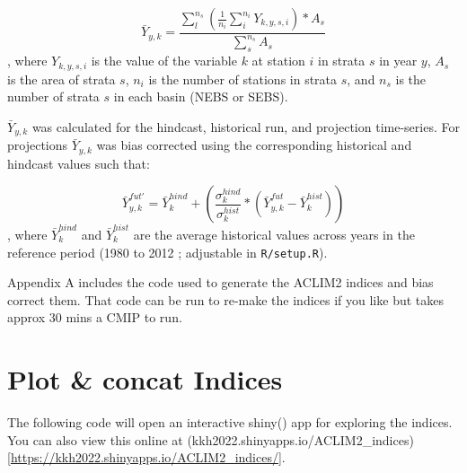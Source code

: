 \documentclass[
]{article}
\newenvironment{Shaded}{\begin{snugshade}}{\end{snugshade}}
\newcommand{\AttributeTok}[1]{\textcolor[rgb]{0.77,0.63,0.00}{#1}}
\newcommand{\CommentTok}[1]{\textcolor[rgb]{0.56,0.35,0.01}{\textit{#1}}}
\newcommand{\FunctionTok}[1]{\textcolor[rgb]{0.00,0.00,0.00}{#1}}
\newcommand{\NormalTok}[1]{#1}
\newcommand{\OtherTok}[1]{\textcolor[rgb]{0.56,0.35,0.01}{#1}}
\newcommand{\SpecialCharTok}[1]{\textcolor[rgb]{0.00,0.00,0.00}{#1}}
\newcommand{\StringTok}[1]{\textcolor[rgb]{0.31,0.60,0.02}{#1}}
\begin{document}
\[\bar{Y}_{y,k}= \frac{\sum^{n_s}_{l}(\frac{1}{n_i}\sum^{n_i}_{i}Y_{k,y,s,i})*A_s} {\sum^{n_s}_{s}{A_s}}\],
where \(Y_{k,y,s,i}\) is the value of the variable \(k\) at station
\(i\) in strata \(s\) in year \(y\), \(A_s\) is the area of strata
\(s\), \(n_i\) is the number of stations in strata \(s\), and \(n_s\) is
the number of strata \(s\) in each basin (NEBS or SEBS).

\(\bar{Y}_{y,k}\) was calculated for the hindcast, historical run, and
projection time-series. For projections \(\bar{Y}_{y,k}\) was bias
corrected using the corresponding historical and hindcast values such
that:

\[\bar{Y}^{fut'}_{y,k} =\bar{Y}^{hind}_{k} +\left( \frac{\sigma^{hind}_{k}}{\sigma^{hist}_{k}}*(\bar{Y}^{fut}_{y,k}-\bar{Y}^{hist}_{k})  \right )\],
where \(\bar{Y}^{hind}_{k}\) and \(\bar{Y}^{hist}_{k}\) are the average
historical values across years in the reference period (1980 to 2012 ;
adjustable in \texttt{R/setup.R}).

Appendix A includes the code used to generate the ACLIM2 indices and
bias correct them. That code can be run to re-make the indices if you
like but takes approx 30 mins a CMIP to run.

\hypertarget{plot-concat-indices}{%
\section{Plot \& concat Indices}\label{plot-concat-indices}}

The following code will open an interactive shiny() app for exploring
the indices. You can also view this online at
(kkh2022.shinyapps.io/ACLIM2\_indices){[}\url{https://kkh2022.shinyapps.io/ACLIM2_indices/}{]}.

\begin{Shaded}
\end{Shaded}
\end{document}
